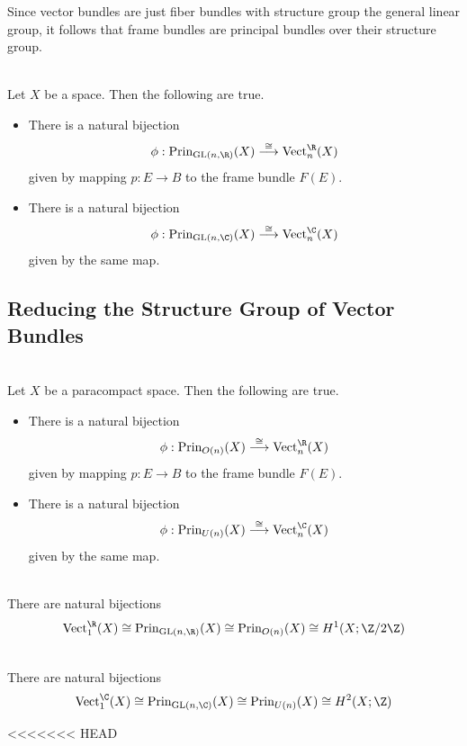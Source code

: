 \documentclass[a4paper]{article}
\begin{document}
Since vector bundles are just fiber bundles with structure group the general linear group, it follows that frame bundles are principal bundles over their structure group. 

\begin{prp}{}{}\\
Let $X$ be a space. Then the following are true. 
\begin{itemize}
\item There is a natural bijection $$\phi:\text{Prin}_{\text{GL}(n,\R)}(X)\overset{\cong}{\longrightarrow}\text{Vect}_n^\R(X)$$ given by mapping $p:E\to B$ to the frame bundle $F(E)$.
\item There is a natural bijection $$\phi:\text{Prin}_{\text{GL}(n,\C)}(X)\overset{\cong}{\longrightarrow}\text{Vect}_n^\C(X)$$ given by the same map. 
\end{itemize}
\end{prp}

\subsection{Reducing the Structure Group of Vector Bundles}
\begin{prp}{}{}\\
Let $X$ be a paracompact space. Then the following are true. 
\begin{itemize}
\item There is a natural bijection $$\phi:\text{Prin}_{O(n)}(X)\overset{\cong}{\longrightarrow}\text{Vect}_n^\R(X)$$ given by mapping $p:E\to B$ to the frame bundle $F(E)$. 
\item There is a natural bijection $$\phi:\text{Prin}_{U(n)}(X)\overset{\cong}{\longrightarrow}\text{Vect}_n^\C(X)$$ given by the same map. 
\end{itemize}
\end{prp}

\begin{eg}{}{}\\
There are natural bijections $$\text{Vect}_1^\R(X)\cong\text{Prin}_{\text{GL}(n,\R)}(X)\cong\text{Prin}_{O(n)}(X)\cong H^1(X;\Z/2\Z)$$
\end{eg}

\begin{eg}{}{}\\
There are natural bijections $$\text{Vect}_1^\C(X)\cong\text{Prin}_{\text{GL}(n,\C)}(X)\cong\text{Prin}_{U(n)}(X)\cong H^2(X;\Z)$$
\end{eg}
<<<<<<< HEAD
\end{document}

